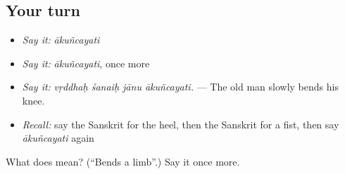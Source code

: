 \subsection*{Your turn}
\begin{itemize}
\raggedright
  \item \emph{Say it:} \emph{ākuñcayati}
  \item \emph{Say it:} \emph{ākuñcayati}, once more
  \item \emph{Say it:} \emph{vṛddhaḥ śanaiḥ jānu ākuñcayati.} — The old man slowly bends his knee.
  \item \emph{Recall:} say the Sanskrit for the heel, then the Sanskrit for a fist, then say \emph{ākuñcayati} again
\end{itemize}

\begin{tcolorbox}[breakable,colback=teal!4,colframe=teal!35!black,title={Before you move on}]
What does  mean? (\textquotedblleft{}Bends a limb\textquotedblright{}.) Say it once more.
\end{tcolorbox}
